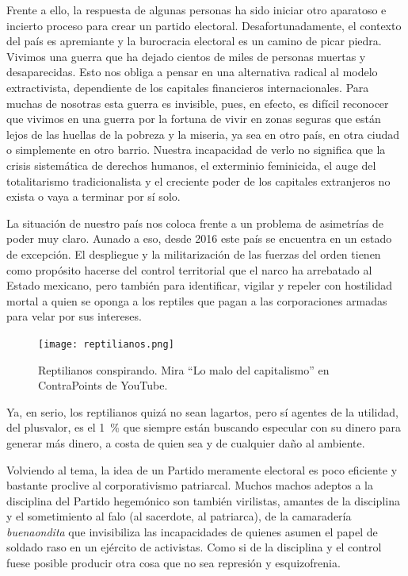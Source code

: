 Frente a ello, la respuesta de algunas personas ha sido iniciar otro aparatoso e incierto proceso para crear un partido electoral. Desafortunadamente, el contexto del país es apremiante y la burocracia electoral es un camino de picar piedra. Vivimos una guerra que ha dejado cientos de miles de personas muertas y desaparecidas. Esto nos obliga a pensar en una alternativa radical al modelo extractivista, dependiente de los capitales financieros internacionales. Para muchas de nosotras esta guerra es invisible, pues, en efecto, es difícil reconocer que vivimos en una guerra por la fortuna de vivir en zonas seguras que están lejos de las huellas de la pobreza y la miseria, ya sea en otro país, en otra ciudad o simplemente en otro barrio. Nuestra incapacidad de verlo no significa que la crisis sistemática de derechos humanos, el exterminio feminicida, el auge del totalitarismo tradicionalista y el creciente poder de los capitales extranjeros no exista o vaya a terminar por sí solo.

La situación de nuestro país nos coloca frente a un problema de asimetrías de poder muy claro. Aunado a eso, desde 2016 este país se encuentra en un estado de excepción. El despliegue y la militarización de las fuerzas del orden tienen como propósito hacerse del control territorial que el narco ha arrebatado al Estado mexicano, pero también para identificar, vigilar y repeler con hostilidad mortal a quien se oponga a los reptiles que pagan a las corporaciones armadas para velar por sus intereses.


\begin{figure}[htbp]
	\centering
	\texttt{[image: reptilianos.png]}
	\caption[Reptilianos conspirando.]{Reptilianos conspirando. Mira \enquote{Lo malo del capitalismo} en ContraPoints de YouTube.}
	\label{fig:reptilianos}
\end{figure}

Ya, en serio, los reptilianos quizá no sean lagartos, pero sí agentes de la utilidad, del plusvalor, es el 1~\% que siempre están buscando especular con su dinero para generar más dinero, a costa de quien sea y de cualquier daño al ambiente.

Volviendo al tema, la idea de un Partido meramente electoral es poco eficiente y bastante proclive al corporativismo patriarcal. Muchos machos adeptos a la disciplina del Partido hegemónico son también virilistas, amantes de la disciplina y el sometimiento al falo (al sacerdote, al patriarca), de la camaradería \emph{buenaondita} que invisibiliza las incapacidades de quienes asumen el papel de soldado raso en un ejército de activistas. Como si de la disciplina y el control fuese posible producir otra cosa que no sea represión y esquizofrenia.

